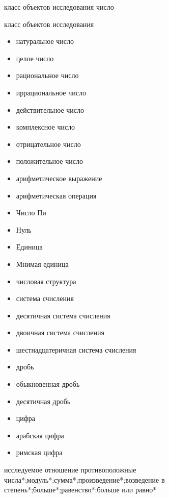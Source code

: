 \begin{SCn}
\scnsectionheader{\currentname}
\begin{scnsubstruct}
\begin{scnhaselementrole}{класс объектов исследования}
число\end{scnhaselementrole}
\begin{scnhaselementrolelist}{класс объектов исследования}
\begin{itemize}
  \item натуральное число
  \item целое число
  \item рациональное число
  \item иррациональное число
  \item действительное число
  \item комплексное число
  \item отрицательное число
  \item положительное число
  \item арифметическое выражение
  \item арифметическая операция
  \item Число Пи
  \item Нуль
  \item Единица
  \item Мнимая единица
  \item числовая структура
  \item система счисления
  \item десятичная система счисления
  \item двоичная система счисления
  \item шестнадцатеричная система счисления
  \item дробь
  \item обыкновенная дробь
  \item десятичная дробь
  \item цифра
  \item арабская цифра
  \item римская цифра
\end{itemize}
\end{scnhaselementrolelist}
\begin{scnhaselementrolelist}{исследуемое отношение}
противоположные числа*;модуль*;сумма*;произведение*;возведение в степень*;больше*;равенство*;больше или равно*
\end{scnhaselementrolelist}

\end{scnsubstruct}
\end{SCn}

